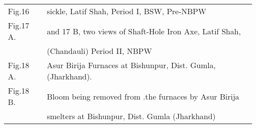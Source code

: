 {\begin{longtable}{@{}p{1.3cm}@{}p{8cm}@{}}
Fig.16  & sickle, Latif Shah, Period I, BSW, Pre-NBPW \\[2pt]

Fig.17 A. &  and 17 B, two views of Shaft-Hole Iron Axe, Latif Shah,\\[2pt]
          &  (Chandauli) Period II, NBPW\\[2pt]
Fig.18 A.  &  Asur Birija Furnaces at Bishunpur, Dist. Gumla, (Jharkhand). \\[2pt]

Fig.18 B. &  Bloom being removed from .the furnaces by Asur Birija \\ [2pt]
          &  smelters at Bishunpur, Dist. Gumla (Jharkhand)
\end{longtable}}
